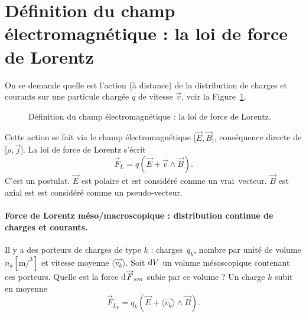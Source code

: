 \section[La loi de force de Lorentz]{Définition du champ électromagnétique : la loi de force de Lorentz}

    On se demande quelle est l'action (à distance) de la distribution de charges et courants sur une particule chargée $q$ de vitesse $\vec{v}$, voir la Figure~\ref{fig:definition_champ_em_loi_force_lorentz}.

    \begin{figure}
        \centering
        \caption{Définition du champ électromagnétique : la loi de force de Lorentz.}    
        \label{fig:definition_champ_em_loi_force_lorentz}
    \end{figure}

    Cette action se fait via le champ électromagnétique [$\vec{E},\vec{B}$], conséquence directe de [$\rho,\vec{j}$]. La loi de force de Lorentz s'écrit
    \begin{equation}
        \boxed{
            \vec{F}_L = q\left(\vec{E}+\vec{v}\wedge\vec{B}\right).
        }
    \end{equation}
    C'est un postulat. $\vec{E}$ est polaire et est considéré comme un \og vrai\fg~vecteur. $\vec{B}$ est axial est est considéré comme un \og pseudo-vecteur\fg.

    \paragraph{Force de Lorentz méso/macroscopique : distribution continue de charges et courants.}

        Il y a des porteurs de charges de type $k$ : charges~$q_k$, nombre par unité de volume $n_k [\si{\metre\per\cubed}]$ et vitesse moyenne $\langle\vec{v_k}\rangle$. Soit $\mathrm{d} V$ un volume mésoscopique contenant ces porteurs. Quelle est la force $\mathrm{d}\protect\overrightarrow{{F}}_{em}$ subie par ce volume ? Un charge $k$ subit en moyenne 
        \begin{equation}
            \vec{F}_{L_k}=q_k\left(\vec{E}+\langle\vec{v_k}\rangle\wedge \vec{B}\right).
        \end{equation}

